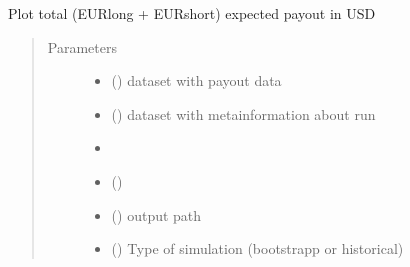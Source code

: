 \documentclass[a4paper,11pt,english]{sphinxmanual}
\begin{document}

\begin{fulllineitems}
\label{\detokenize{simulation_analysis:src.simulation_analysis.task_swap_payout_analysis.plot_expected_payout_USD}}
\sphinxAtStartPar
Plot total (EURlong + EURshort) expected payout in USD
\begin{quote}\begin{description}
\item[{Parameters}] \leavevmode\begin{itemize}
\item {} 
\sphinxAtStartPar
{} () \textendash{} dataset with payout data

\item {} 
\sphinxAtStartPar
{} () \textendash{} dataset with metainformation about run

\item {} 
\sphinxAtStartPar
\sphinxstyleliteralstrong{\sphinxupquote{(}} \textendash{} 

\item {} 
\sphinxAtStartPar
{}\sphinxstyleliteralstrong{\sphinxupquote{)}} () \textendash{} 

\item {} 
\sphinxAtStartPar
{} () \textendash{} output path

\item {} 
\sphinxAtStartPar
{} () \textendash{} Type of simulation (bootstrapp or historical)

\end{itemize}

\end{description}\end{quote}

\end{fulllineitems}
\end{document}
